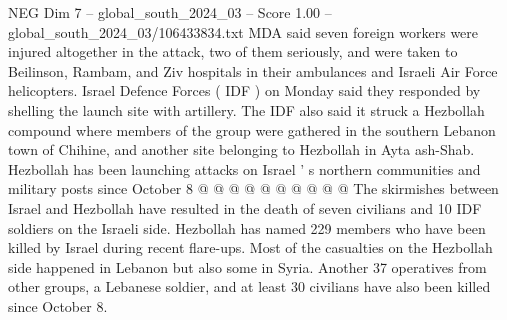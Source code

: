 \begin{textsample}{NEG Dim 7 – global\_south\_2024\_03 – Score 1.00 – global\_south\_2024\_03/106433834.txt}
MDA said seven foreign workers were injured altogether in the attack, two of them seriously, and were taken to Beilinson, Rambam, and Ziv hospitals in their ambulances and Israeli Air Force helicopters.
Israel Defence Forces ( IDF ) on Monday said they responded by shelling the launch site with artillery.
The IDF also said it struck a Hezbollah compound where members of the group were gathered in the southern Lebanon town of Chihine, and another site belonging to Hezbollah in Ayta ash-Shab.
Hezbollah has been launching attacks on Israel ' s northern communities and military posts since October 8 @ @ @ @ @ @ @ @ @ @ The skirmishes between Israel and Hezbollah have resulted in the death of seven civilians and 10 IDF soldiers on the Israeli side.
Hezbollah has named 229 members who have been killed by Israel during recent flare-ups.
Most of the casualties on the Hezbollah side happened in Lebanon but also some in Syria.
Another 37 operatives from other groups, a Lebanese soldier, and at least 30 civilians have also been killed since October 8.

\end{textsample}
